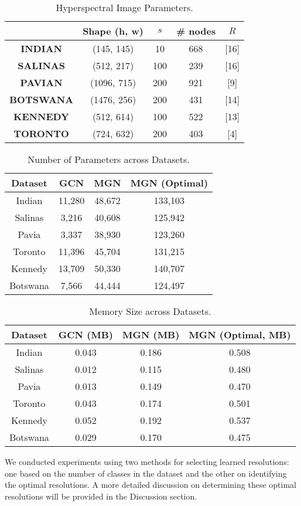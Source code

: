 \begin{table}[h]
\centering
\caption{Hyperspectral Image Parameters.}
\label{tab:hyperspectral_params}
\begin{tabular}{|c|c|c|c|c|}
\hline
 & \textbf{Shape (h, w)} & \textbf{$s$} & \textbf{\# nodes} & \textbf{$R$} \\
\hline
\textbf{INDIAN} & (145, 145) & 10 & 668 & [16] \\
\hline
\textbf{SALINAS} & (512, 217) & 100 & 239 & [16] \\
\hline
\textbf{PAVIAN} & (1096, 715) & 200 & 921 & [9] \\
\hline
\textbf{BOTSWANA} & (1476, 256) & 200 & 431 & [14] \\
\hline
\textbf{KENNEDY} & (512, 614) & 100 & 522 & [13] \\
\hline
\textbf{TORONTO} & (724, 632) & 200 & 403 & [4] \\
\hline
\end{tabular}
\end{table}

\begin{table}[h!]
\centering
\caption{Number of Parameters across Datasets.}
\label{tab:number_of_params}
\begin{tabular}{|c|c|c|c|}
\hline
\textbf{Dataset} & \textbf{GCN} & \textbf{MGN} & \textbf{MGN (Optimal)} \\ \hline
Indian   & 11,280   & 48,672   & 133,103    \\ \hline
Salinas  & 3,216    & 40,608   & 125,942    \\ \hline
Pavia    & 3,337    & 38,930   & 123,260    \\ \hline
Toronto  & 11,396   & 45,704   & 131,215    \\ \hline
Kennedy  & 13,709   & 50,330   & 140,707    \\ \hline
Botswana & 7,566    & 44,444   & 124,497    \\ \hline
\end{tabular}
\end{table}

\begin{table}[h!]
\centering
\caption{Memory Size across Datasets.}
\label{tab:memory_size}
\begin{tabular}{|c|c|c|c|}
\hline
\textbf{Dataset} & \textbf{GCN (MB)} & \textbf{MGN (MB)} & \textbf{MGN (Optimal, MB)} \\ \hline
Indian   & 0.043  & 0.186  & 0.508  \\ \hline
Salinas  & 0.012  & 0.115  & 0.480  \\ \hline
Pavia    & 0.013  & 0.149  & 0.470  \\ \hline
Toronto  & 0.043  & 0.174  & 0.501  \\ \hline
Kennedy  & 0.052  & 0.192  & 0.537  \\ \hline
Botswana & 0.029  & 0.170  & 0.475  \\ \hline
\end{tabular}
\end{table}

We conducted experiments using two methods for selecting learned resolutions: one based on the number of classes in the dataset and the other on identifying the optimal resolutions. A more detailed discussion on determining these optimal resolutions will be provided in the Discussion section.